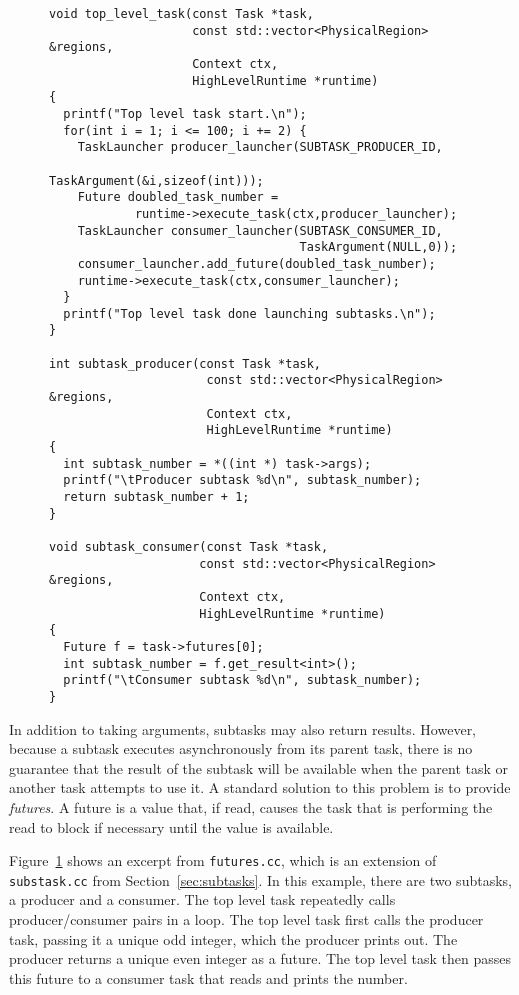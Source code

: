 \begin{figure}
\begin{lstlisting}
void top_level_task(const Task *task,
                    const std::vector<PhysicalRegion> &regions,
                    Context ctx,
                    HighLevelRuntime *runtime)
{
  printf("Top level task start.\n");
  for(int i = 1; i <= 100; i += 2) {
    TaskLauncher producer_launcher(SUBTASK_PRODUCER_ID, 
                                   TaskArgument(&i,sizeof(int)));
    Future doubled_task_number =  
            runtime->execute_task(ctx,producer_launcher);
    TaskLauncher consumer_launcher(SUBTASK_CONSUMER_ID, 
                                   TaskArgument(NULL,0));
    consumer_launcher.add_future(doubled_task_number);
    runtime->execute_task(ctx,consumer_launcher);
  }
  printf("Top level task done launching subtasks.\n");
}

int subtask_producer(const Task *task,
                      const std::vector<PhysicalRegion> &regions,
                      Context ctx,
                      HighLevelRuntime *runtime)
{
  int subtask_number = *((int *) task->args);
  printf("\tProducer subtask %d\n", subtask_number);
  return subtask_number + 1;
}

void subtask_consumer(const Task *task,
                     const std::vector<PhysicalRegion> &regions,
                     Context ctx,
                     HighLevelRuntime *runtime)
{
  Future f = task->futures[0];
  int subtask_number = f.get_result<int>();
  printf("\tConsumer subtask %d\n", subtask_number);
}
\end{lstlisting}
\caption{}
\label{fig:futures}
\end{figure}

In addition to taking arguments, subtasks may also return results.
However, because a subtask executes asynchronously from its parent
task, there is no guarantee that the result of the subtask will be
available when the parent task or another task attempts to use it.  A
standard solution to this problem is to provide {\em futures}.  A future
is a value that, if read, causes the task that is performing the
read to block if necessary until the value is available.

Figure~\ref{fig:futures} shows an excerpt from {\tt futures.cc}, which
is an extension of {\tt substask.cc} from
Section~\ref{sec:subtasks}.  In this example, there are two subtasks,
a producer and a consumer.  The top level task repeatedly calls
\mbox{producer/consumer} pairs in a loop.  The top level task first calls the
producer task, passing it a unique odd integer, which the producer
prints out.  The producer returns a unique even integer as a future.
The top level task then passes this future to a consumer task that
reads and prints the number.

